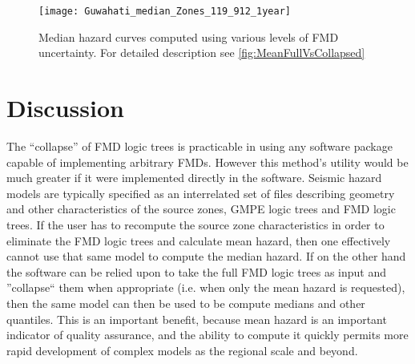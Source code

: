 \documentclass{article}
\begin{document}
\begin{figure}[!htb]
\begin{adjustbox}{center}
\texttt{[image: Guwahati\_median\_Zones\_119\_912\_1year]}
\end{adjustbox}
\caption[Median hazard curves computed using various levels of FMD uncertainty]{Median hazard curves computed using various levels of FMD uncertainty. 
For detailed description see \autoref{fig:MeanFullVsCollapsed}} 
\label{fig:MedianFullVsCollapsed}
\end{figure}

\section{Discussion}

The ``collapse'' of FMD logic trees is practicable in using any software package capable of implementing arbitrary FMDs.
However this method's utility would be much greater if it were implemented directly in the software.
Seismic hazard models are typically specified as an interrelated set of files describing geometry and other characteristics of the source zones, GMPE logic trees and FMD logic trees.
If the user has to recompute the source zone characteristics in order to eliminate the FMD logic trees and calculate mean hazard, then one effectively cannot use that same model to compute the median hazard.
If on the other hand the software can be relied upon to take the full FMD logic trees as input and ''collapse`` them when appropriate (i.e. when only the mean hazard is requested), then the same model can then be used to be compute medians and other quantiles. 
This is an important benefit, because mean hazard is an important indicator of quality assurance, and the ability to compute it quickly permits more rapid development of complex models as the regional scale and beyond.
\end{document}
